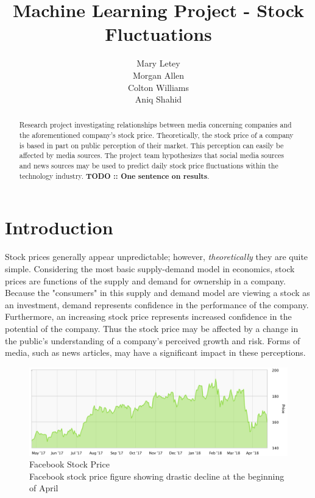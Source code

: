 \documentclass{article}
\title{Machine Learning Project - Stock Fluctuations}
\author{
  Mary Letey \\
  \And
  Morgan Allen \\
  \And
  Colton Williams \\
  \And
  Aniq Shahid 
}
\begin{document}
\maketitle

\begin{abstract}
  Research project investigating relationships between media concerning companies and the aforementioned company's stock price. Theoretically, the stock price of a company is based in part on public perception of their market. This perception can easily be affected by media sources. The project team hypothesizes that social media sources and news sources may be used to predict daily stock price fluctuations within the technology industry. \textbf{TODO :: One sentence on results}.
\end{abstract}
 
\section{Introduction}

Stock prices generally appear unpredictable; however, \emph{theoretically} they are quite simple. Considering the most basic supply-demand model in economics, stock prices are functions of the supply and demand for ownership in a company. Because the "consumers" in this supply and demand model are viewing a stock as an investment, demand represents confidence in the performance of the company. Furthermore, an increasing stock price represents increased confidence in the potential of the company. Thus the stock price may be affected by a change in the public's understanding of a company's perceived growth and risk. Forms of media, such as news articles, may have a significant impact in these perceptions.

\begin{figure}[H]
    \includegraphics[scale=0.5]{FacebookYear.png}
  \caption{Facebook Stock Price \\
  \small Facebook stock price figure showing drastic decline at the beginning of April}
  \label{fig:faceplant}
\end{figure}
\end{document}
